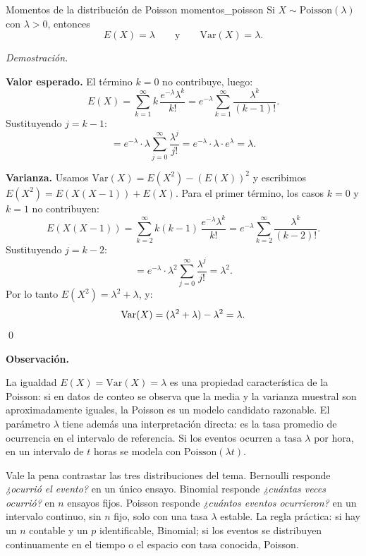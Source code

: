 \documentclass[12pt, a4paper]{book}
\newenvironment{observacion}{%
    \par\medskip\noindent\textbf{\color{azul}Observaci\'{o}n.}\enspace\itshape
}{\par\medskip}
\renewenvironment{proof}{%
    \par\medskip\noindent\textit{Demostraci\'{o}n.}\enspace
}{\qed\par\medskip}
\numberwithin{equation}{chapter}
\begin{document}
\begin{proposicion}{Momentos de la distribuci\'{o}n de Poisson}
	{momentos_poisson}
	Si $X \sim \mathrm{Poisson}(\lambda)$ con $\lambda > 0$, entonces
	\[
	E(X) = \lambda \qquad \text{y} \qquad \mathrm{Var}(X) = \lambda.
	\]
\end{proposicion}

\begin{proof}
	\textbf{Valor esperado.} El término $k=0$ no contribuye, luego:
	\[
	E(X)
	= \sum_{k=1}^{\infty} k\,\frac{e^{-\lambda}\lambda^k}{k!}
	= e^{-\lambda}\sum_{k=1}^{\infty} \frac{\lambda^k}{(k-1)!}.
	\]
	Sustituyendo $j = k-1$:
	\[
	= e^{-\lambda}\cdot\lambda \sum_{j=0}^{\infty}
	\frac{\lambda^j}{j!}
	= e^{-\lambda}\cdot\lambda\cdot e^{\lambda} = \lambda.
	\]
	
	\textbf{Varianza.} Usamos $\mathrm{Var}(X) = E(X^2)-(E(X))^2$
	y escribimos $E(X^2) = E(X(X-1)) + E(X)$. Para el primer término,
	los casos $k=0$ y $k=1$ no contribuyen:
	\[
	E(X(X-1))
	= \sum_{k=2}^{\infty} k(k-1)\,\frac{e^{-\lambda}\lambda^k}{k!}
	= e^{-\lambda}\sum_{k=2}^{\infty}\frac{\lambda^k}{(k-2)!}.
	\]
	Sustituyendo $j = k-2$:
	\[
	= e^{-\lambda}\cdot\lambda^2\sum_{j=0}^{\infty}
	\frac{\lambda^j}{j!}
	= \lambda^2.
	\]
	Por lo tanto $E(X^2) = \lambda^2 + \lambda$, y:
	\[
	\mathrm{Var}(X) = (\lambda^2+\lambda) - \lambda^2
	= \lambda. \qedhere
	\]
\end{proof}

\begin{observacion}
	La igualdad $E(X) = \mathrm{Var}(X) = \lambda$ es una propiedad
	característica de la Poisson: si en datos de conteo se observa que
	la media y la varianza muestral son aproximadamente iguales, la
	Poisson es un modelo candidato razonable. El parámetro $\lambda$
	tiene además una interpretación directa: es la tasa promedio de
	ocurrencia en el intervalo de referencia. Si los eventos ocurren
	a tasa $\lambda$ por hora, en un intervalo de $t$ horas se modela
	con $\mathrm{Poisson}(\lambda t)$.
\end{observacion}

Vale la pena contrastar las tres distribuciones del tema. Bernoulli
responde \emph{¿ocurrió el evento?} en un único ensayo. Binomial
responde \emph{¿cuántas veces ocurrió?} en $n$ ensayos fijos. Poisson
responde \emph{¿cuántos eventos ocurrieron?} en un intervalo continuo,
sin $n$ fijo, solo con una tasa $\lambda$ estable. La regla práctica:
si hay un $n$ contable y un $p$ identificable, Binomial; si los
eventos se distribuyen continuamente en el tiempo o el espacio con
tasa conocida, Poisson.
\end{document}
